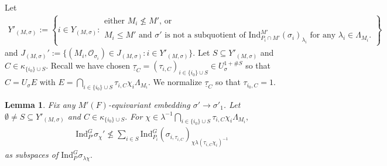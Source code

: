 \documentclass[10pt]{amsart}
\newtheorem{lemma}[theorem]{Lemma}
\theoremstyle{definition}
\numberwithin{equation}{section}
\numberwithin{equation}{subsection}
\newcommand{\Ind}{\mathrm{Ind}}
\begin{document}
Let
\begin{align*}
    Y'_{(M,\sigma)} := \left\{i\in Y_{(M,\sigma)}:\begin{array}{l}
         \text{either $M_i\not\le M'$, or}  \\
          \text{$M_i\le M'$ and $\sigma'$ is not a subquotient of $\Ind^{M'}_{P_i\cap M'} (\sigma_i)_{\lambda_i}$ for any $\lambda_i\in \Lambda_{M_i}.$}
    \end{array}\right\}
\end{align*}
and $J_{(M,\sigma)}' := \{(M_i,\mathcal{O}_{\sigma_i})\in J_{(M,\sigma)}: i\in Y'_{(M,\sigma)} \}$. Let $S\subseteq Y'_{(M,\sigma)}$ and $C\in \kappa_{\{i_0\}\cup S}.$ Recall we have chosen $\underline{\tau}_C=(\tau_{i,C})_{i\in \{i_0\}\cup S}\in U_\sigma^{1+\#S}$ so that $C=U_{\sigma}E$ with $E=\bigcap_{i\in \{i_0\}\cup S} \tau_{i,C}\chi_i\Lambda_{M_i}.$ We normalize $\underline{\tau}_{C}$ so that  $\tau_{i_0,C}=1.$ 

\begin{lemma}\label{lem:discretenonzero}
Fix any $M'(F)$-equivariant embedding $\sigma'\to \sigma'_1$. Let $\emptyset\neq S\subseteq Y'_{(M,\sigma)}$ and $C\in \kappa_{\{i_0\}\cup S}.$ For $\chi\in \lambda^{-1}\bigcap_{i\in \{i_0\}\cup S} \tau_{i,C}\chi_i\Lambda_{M_i},$
\begin{align*}
    \mathrm{Ind}_{P'}^G \sigma_{\chi}'\not\leq \sum_{i\in S}\mathrm{Ind}_{P_i}^{G} (\sigma_{i,\tau_{i,C}})_{\chi\lambda(\tau_{i,C}\chi_i)^{-1}}
\end{align*}
as subspaces of $\mathrm{Ind}_{P}^G \sigma_{\lambda\chi}.$
\end{lemma}
\end{document}
